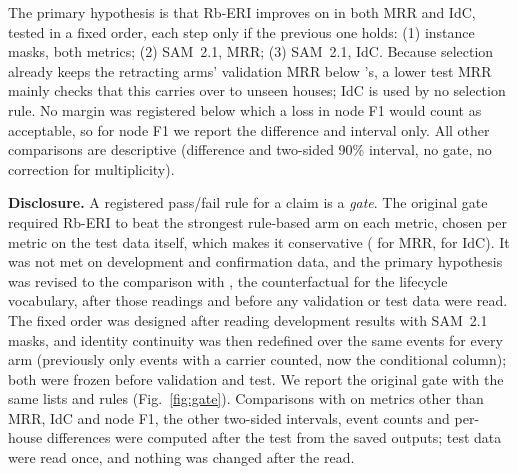 The primary hypothesis is that Rb-ERI improves on  in both MRR and IdC, tested in a fixed order, each step only if the previous one holds: (1) instance masks, both metrics; (2) SAM~2.1, MRR; (3) SAM~2.1, IdC.
Because selection already keeps the retracting arms' validation MRR below 's, a lower test MRR mainly checks that this carries over to unseen houses; IdC is used by no selection rule.
No margin was registered below which a loss in node F1 would count as acceptable, so for node F1 we report the difference and interval only.
All other comparisons are descriptive (difference and two-sided 90\% interval, no gate, no correction for multiplicity).

\textbf{Disclosure.}
A registered pass/fail rule for a claim is a \emph{gate}.
The original gate required Rb-ERI to beat the strongest rule-based arm on each metric, chosen per metric on the test data itself, which makes it conservative ( for MRR,  for IdC).
It was not met on development and confirmation data, and the primary hypothesis was revised to the comparison with , the counterfactual for the lifecycle vocabulary, after those readings and before any validation or test data were read.
The fixed order was designed after reading development results with SAM~2.1 masks, and identity continuity was then redefined over the same events for every arm (previously only events with a carrier counted, now the conditional column); both were frozen before validation and test.
We report the original gate with the same lists and rules (Fig.~\ref{fig:gate}).
Comparisons with  on metrics other than MRR, IdC and node F1, the other two-sided intervals, event counts and per-house differences were computed after the test from the saved outputs; test data were read once, and nothing was changed after the read.
